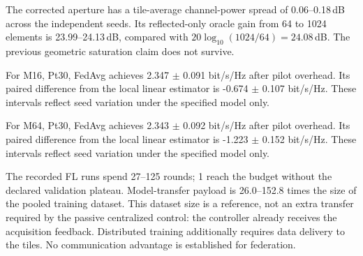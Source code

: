 The corrected aperture has a tile-average channel-power spread of 0.06--0.18\,dB across the independent seeds. Its reflected-only oracle gain from 64 to 1024 elements is 23.99--24.13\,dB, compared with $20\log_{10}(1024/64)=24.08$\,dB. The previous geometric saturation claim does not survive.

For M16, Pt30, FedAvg achieves 2.347 $\pm$ 0.091 bit/s/Hz after pilot overhead. Its paired difference from the local linear estimator is -0.674 $\pm$ 0.107 bit/s/Hz. These intervals reflect seed variation under the specified model only.

For M64, Pt30, FedAvg achieves 2.343 $\pm$ 0.092 bit/s/Hz after pilot overhead. Its paired difference from the local linear estimator is -1.223 $\pm$ 0.152 bit/s/Hz. These intervals reflect seed variation under the specified model only.

The recorded FL runs spend 27--125 rounds; 1 reach the budget without the declared validation plateau. Model-transfer payload is 26.0--152.8 times the size of the pooled training dataset. This dataset size is a reference, not an extra transfer required by the passive centralized control: the controller already receives the acquisition feedback. Distributed training additionally requires data delivery to the tiles. No communication advantage is established for federation.
